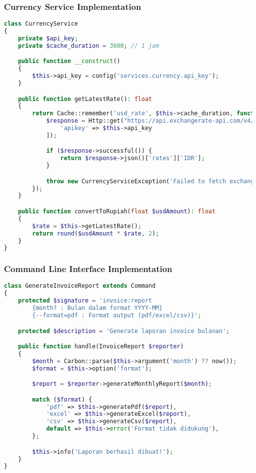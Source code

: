 \documentclass[a4paper]{report}
\begin{document}
\subsubsection{Currency Service Implementation}
\begin{lstlisting}[language=PHP]
class CurrencyService
{
    private $api_key;
    private $cache_duration = 3600; // 1 jam

    public function __construct()
    {
        $this->api_key = config('services.currency.api_key');
    }

    public function getLatestRate(): float
    {
        return Cache::remember('usd_rate', $this->cache_duration, function () {
            $response = Http::get("https://api.exchangerate-api.com/v4/latest/USD", [
                'apikey' => $this->api_key
            ]);

            if ($response->successful()) {
                return $response->json()['rates']['IDR'];
            }

            throw new CurrencyServiceException('Failed to fetch exchange rate');
        });
    }

    public function convertToRupiah(float $usdAmount): float
    {
        $rate = $this->getLatestRate();
        return round($usdAmount * $rate, 2);
    }
}
\end{lstlisting}

\subsubsection{Command Line Interface Implementation}
\begin{lstlisting}[language=PHP]
class GenerateInvoiceReport extends Command
{
    protected $signature = 'invoice:report 
        {month? : Bulan dalam format YYYY-MM} 
        {--format=pdf : Format output (pdf/excel/csv)}';

    protected $description = 'Generate laporan invoice bulanan';

    public function handle(InvoiceReport $reporter)
    {
        $month = Carbon::parse($this->argument('month') ?? now());
        $format = $this->option('format');

        $report = $reporter->generateMonthlyReport($month);

        match ($format) {
            'pdf' => $this->generatePdf($report),
            'excel' => $this->generateExcel($report),
            'csv' => $this->generateCsv($report),
            default => $this->error('Format tidak didukung'),
        };

        $this->info('Laporan berhasil dibuat!');
    }
}
\end{lstlisting}
\end{document}
